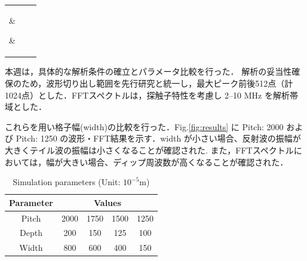 \documentclass{jarticle}
\makeatletter
\def \tbcaption{\def \@captype{table} \caption}
\makeatother
\begin{document}
%
\begin{center}
 \begin{tabular}{|c|c|c|} \hline
  \parbox{50mm}{\vspace{1mm} } & 
  \parbox{55mm}{\vspace{1mm} } & 
  \parbox{50mm}{\vspace{1mm} }
  \\ [2mm] \hline
%
  \\ [2mm] \hline\hline
%
  \\ [2mm] \hline
 \end{tabular}
%
\end{center}
%
\par
本週は，具体的な解析条件の確立とパラメータ比較を行った．
解析の妥当性確保のため，波形切り出し範囲を先行研究と統一し，最大ピーク前後512点（計1024点）とした．FFTスペクトルは，探触子特性を考慮し 2--10 MHz を解析帯域とした．

これらを用い格子幅(width)の比較を行った．Fig.\ref{fig:results} に Pitch: 2000 および Pitch: 1250 の波形・FFT結果を示す．width が小さい場合、反射波の振幅が大きくテイル波の振幅は小さくなることが確認された.
また，FFTスペクトルにおいては，幅が大きい場合、ディップ周波数が高くなることが確認された．
\begin{table}[htb]
  \centering
  \tbcaption{Simulation parameters (Unit: $10^{-5}$m)}
  \label{tab:params}
  \begin{tabular}{ccccc} \hline
    Parameter & \multicolumn{4}{c}{Values} \\ \hline
    Pitch & 2000 & 1750 & 1500 & 1250 \\
    Depth & 200 & 150 & 125 & 100 \\
    Width & 800 & 600 & 400 & 150 \\ \hline
  \end{tabular}
\end{table}
\end{document}
